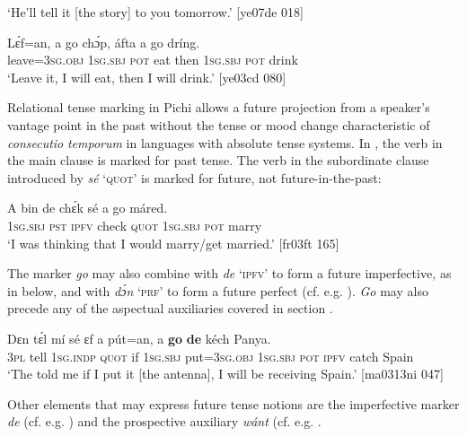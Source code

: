 \glt ‘He’ll tell it [the story] to you tomorrow.’ [ye07de 018]
\z


\ea%
    \label{ex:key:389}
    \gll Lɛ́f=an,    a    go  chɔ́p,  áfta    a    go  dríng.\\
leave=\textsc{3sg.obj}  \textsc{1sg.sbj}  \textsc{pot}  eat    then  \textsc{1sg.sbj}  \textsc{pot}  drink\\

\glt ‘Leave it, I will eat, then I will drink.’ [ye03cd 080]
\z

Relational tense marking in Pichi allows a future projection from a speaker’s vantage point in the past without the tense or mood change characteristic of \textit{consecutio} \textit{temporum} in languages with absolute tense systems. In , the verb in the main clause is marked for past tense. The verb in the subordinate clause introduced by \textit{sé} ‘\textsc{quot}’ is marked for future, not future-in-the-past: 


\ea%
    \label{ex:key:390}
    \gll A    bin  de    chɛ́k  sé    a    go  máred.\\
\textsc{1sg.sbj}  \textsc{pst}  \textsc{ipfv}    check  \textsc{quot}    \textsc{1sg.sbj}  \textsc{pot}  marry\\

\glt ‘I was thinking that I would marry/get married.’ [fr03ft 165]
\z

The marker \textit{go} may also combine with \textit{de} ‘\textsc{ipfv’} to form a future imperfective\textit{,} {{as in  below,}}\textit{} and\textit{} with \textit{dɔ́n} ‘\textsc{prf}’ to form a future perfect (cf. e.g. ). \textit{Go} may also precede any of the aspectual auxiliaries covered in section .


\ea%
    \label{ex:key:391}
    \gll Dɛn  tɛ́l  mí    sé    ɛf  a    pút=an,
a    \textbf{go}  \textbf{de}  kéch  Panya.\\
\textsc{3pl}  tell  \textsc{1sg.indp}  \textsc{quot}    if  \textsc{1sg.sbj}  put=\textsc{3sg.obj}
\textsc{1sg.sbj}  \textsc{pot}  \textsc{ipfv}  catch  Spain\\

\glt ‘The told me if I put it [the antenna], I will be receiving Spain.’ [ma0313ni 047]
\z

Other elements that may express future tense notions are the imperfective marker \textit{de} (cf. e.g. ) and the prospective auxiliary \textit{wánt} (cf. e.g. .

